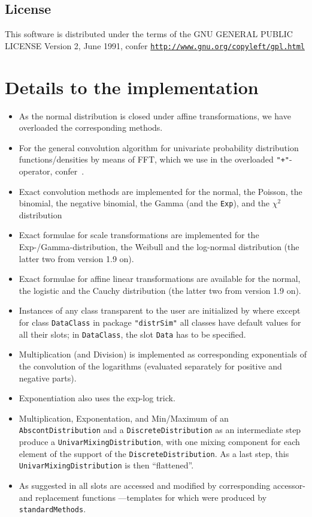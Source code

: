 \documentclass[11pt]{article}
\newcommand{\code}[1]{{\tt #1}}
\newcommand{\pkg}[1]{{\tt "#1"}}
\begin{document}
\subsection{License}
This software is distributed under the terms of the GNU GENERAL
PUBLIC LICENSE Version 2, June 1991, confer\newline
\href{http://www.gnu.org/copyleft/gpl.html}%
{\footnotesize \tt http://www.gnu.org/copyleft/gpl.html}

\section{Details to the implementation}
\begin{itemize}
\item As the normal distribution is closed under affine transformations, we have
overloaded the corresponding methods.
\item For the general convolution algorithm for univariate probability
distribution functions/densities by means of FFT, which we use in the
overloaded {\tt "+"}-operator, confer~\cite{K:R:S:04}.
\item Exact convolution methods are implemented for the normal, the Poisson,
the binomial, the negative binomial, the Gamma (and the \code{Exp}), and
the {$\chi^2$} distribution
\item Exact formulae for scale transformations are implemented for
the Exp-/Gamma-distribution, the Weibull and the log-normal distribution
(the latter two from version 1.9 on).
\item Exact formulae for affine linear transformations are available for
the normal, the logistic and the Cauchy distribution (the latter two from
version 1.9 on).
\item Instances of any class transparent to the user are initialized
by
where except for class \code{DataClass} in package \pkg{distrSim} all classes
have default values for all their slots; in \code{DataClass},
the slot \code{Data} has to be specified.
\item Multiplication (and Division) is implemented as corresponding
exponentials of the convolution of the logarithms (evaluated separately
for positive and negative parts).
\item Exponentiation also uses the exp-log trick.
\item Multiplication, Exponentation, and Min/Maximum of an \code{AbscontDistribution}
and a \code{DiscreteDistribution} as an intermediate step produce
a \code{UnivarMixingDistribution}, with one mixing component for each element
of the support of the \code{DiscreteDistribution}. As a last step,
this \code{UnivarMixingDistribution} is then ``flattened''.
\item
As suggested in \cite{OOPGent} all slots are accessed and modified by
corresponding accessor- and replacement functions ---templates for which were
produced by \code{standardMethods}.


\end{itemize}
\end{document}
